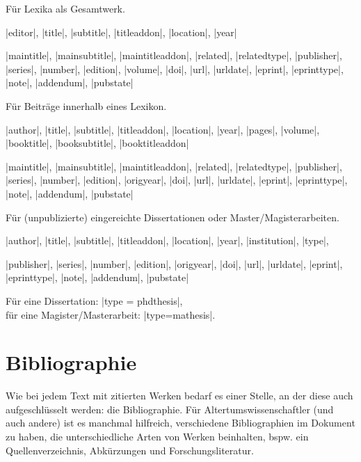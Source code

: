 \documentclass[a4paper,10pt,ngerman]{ltxdoc}
\begin{document}


  Für Lexika als Gesamtwerk.
\begin{description}[topsep=0pt]
\item[Notwendig:] |editor|, |title|, |subtitle|, |titleaddon|, |location|, |year|
\item[Optional:] |maintitle|, |mainsubtitle|, |maintitleaddon|, |related|, |relatedtype|,
|publisher|, |series|, |number|, |edition|, |volume|, |doi|, |url|, |urldate|, |eprint|, |eprinttype|, |note|, |addendum|, |pubstate|
\end{description}



  Für Beiträge innerhalb eines Lexikon.
\begin{description}[topsep=0pt]
\item[Notwendig:] |author|, |title|, |subtitle|, |titleaddon|, |location|, |year|, |pages|, |volume|, |booktitle|, |booksubtitle|, |booktitleaddon|
\item[Optional:] |maintitle|, |mainsubtitle|, |maintitleaddon|, |related|, |relatedtype|,
|publisher|, |series|, |number|, |edition|, |origyear|, |doi|, |url|, |urldate|, |eprint|, |eprinttype|, |note|, |addendum|, |pubstate|
\end{description}



  Für (unpublizierte) eingereichte Dissertationen oder Master/Magisterarbeiten.
\begin{description}[topsep=0pt]
\item[Notwendig:] |author|, |title|, |subtitle|, |titleaddon|, |location|, |year|, |institution|,  |type|, 
\item[Optional:] |publisher|, |series|, |number|, |edition|, |origyear|, |doi|, |url|, |urldate|, |eprint|, |eprinttype|, |note|, |addendum|, |pubstate|
\end{description}

Für eine Dissertation:  |type = {phdthesis}|, \\ für eine Magister/Masterarbeit: |type={mathesis}|.



\section{Bibliographie}\label{bibliographie}
\DescribeMacro{\printbibliography}
Wie bei jedem Text mit zitierten Werken bedarf es einer Stelle, an der diese auch aufgeschlüsselt werden: die Bibliographie. 
Für Altertumswissenschaftler (und auch andere) ist es manchmal hilfreich, verschiedene Bibliographien im Dokument zu haben, die unterschiedliche Arten von Werken beinhalten, bspw. ein Quellenverzeichnis, Abkürzungen und Forschungsliteratur. 
\end{document}
